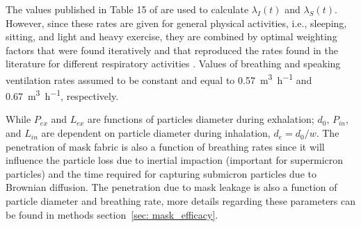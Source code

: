 \documentclass[preprint]{elsarticle}
\begin{document}
The values published in Table 15 of \cite{ICRP1994} are used to calculate $\lambda_{I}(t)$ and $\lambda_{S}(t)$.
However, since these rates are given for general physical activities, i.e., sleeping, sitting, and light and heavy exercise, they are combined by optimal weighting factors that were found iteratively and that reproduced the rates found in the literature for different respiratory activities \cite{hoit1990speech, Gupta_2009, Gupta_2010}. Values of breathing and speaking ventilation rates assumed to be constant and equal to \SI{0.57}{\cubic\meter\per\hour} and \SI{0.67}{\cubic\meter\per\hour}, respectively.

While $P_{ex}$ and $L_{ex}$ are functions of particles diameter during exhalation; $d_0$, $P_{in}$, and $L_{in}$ are dependent on particle diameter during inhalation, $d_e = d_0/w$. The penetration of mask fabric is also a function of breathing rates since it will influence the particle loss due to inertial impaction (important for supermicron particles) and the time required for capturing submicron particles due to Brownian diffusion. The penetration due to mask leakage is also a function of particle diameter and breathing rate, more details regarding these parameters can be found in methods section~\ref{sec: mask_efficacy}. 
\end{document}
